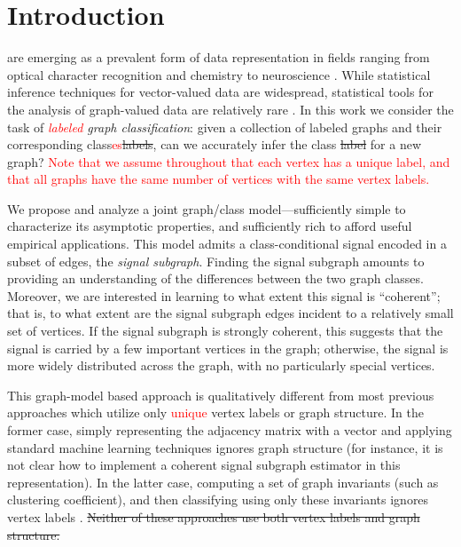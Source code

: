 \documentclass[10pt,journal,cspaper,compsoc]{IEEEtran}
\providecommand{\tr}[1]{\textcolor{red}{#1}}
\begin{document}
\maketitle
\IEEEdisplaynotcompsoctitleabstractindextext
\IEEEpeerreviewmaketitle



\section{Introduction}

 are emerging as a prevalent form of data representation in fields ranging from optical character recognition and chemistry \cite{Bunke2011} to neuroscience \cite{Hagmann2010}.  While statistical inference techniques for vector-valued data are widespread, statistical tools for the analysis of graph-valued data are relatively rare \cite{Bunke2011}. In this work we consider the task of \emph{\tr{labeled} graph classification}: given a collection of labeled graphs and their corresponding class\tr{es}\sout{labels}, can we accurately infer the class \sout{label} for a new graph?  \tr{Note that we assume throughout that each vertex has a unique label, and that all graphs have the same number of vertices with the same vertex labels.}

We propose and analyze a joint graph/class model---sufficiently simple to characterize its asymptotic properties, and sufficiently rich to afford useful empirical applications.  This model admits a class-conditional signal encoded in a subset of edges, the \emph{signal subgraph}. Finding the signal subgraph amounts to providing an understanding of the differences between the two graph classes.  Moreover, we are interested in learning to what extent this signal is ``coherent''; that is, to what extent are the signal subgraph edges incident to a relatively small set of vertices. If the signal subgraph is strongly coherent, this suggests that the signal is carried by a few important vertices in the graph; otherwise, the signal is more widely distributed across the graph, with no particularly special vertices. 

This graph-model based approach is qualitatively different from most previous approaches which utilize only \tr{unique} vertex labels or graph structure.  In the former case, simply representing the adjacency matrix with a vector and applying standard machine learning techniques ignores graph structure (for instance, it is not clear how to implement a coherent signal subgraph estimator in this representation).  In the latter case, computing a set of graph invariants (such as clustering coefficient), and then classifying using only these invariants ignores vertex labels \tr{\cite{Kudo2005,Ketkar2009,Bunke2011}}.  \sout{Neither of these approaches use both vertex labels and graph structure.}  
\end{document}
